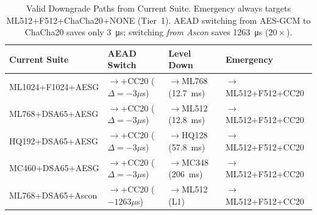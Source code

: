 \begin{table}[!t]
\centering
\caption{Valid Downgrade Paths from Current Suite.
Emergency always targets ML512+F512+ChaCha20+NONE (Tier~1).
AEAD switching from AES-GCM to ChaCha20 saves only \SI{3}{\micro\second};
switching \emph{from Ascon} saves \SI{1263}{\micro\second} ($20{\times}$).}
\label{tab:sched_downgrade}
\footnotesize
\setlength{\tabcolsep}{2.5pt}
\begin{tabular}{@{}l l l l@{}}
\toprule
\textbf{Current Suite} & \textbf{AEAD Switch} & \textbf{Level Down}
& \textbf{Emergency} \\
\midrule
ML1024+F1024+AESG
 & $\to$+CC20 ($\Delta{=}{-}3\mu$s)
 & $\to$ML768 (\SI{12.7}{\ms})
 & $\to$ML512+F512+CC20 \\
ML768+DSA65+AESG
 & $\to$+CC20 ($\Delta{=}{-}3\mu$s)
 & $\to$ML512 (\SI{12.8}{\ms})
 & $\to$ML512+F512+CC20 \\
HQ192+DSA65+AESG
 & $\to$+CC20 ($\Delta{=}{-}3\mu$s)
 & $\to$HQ128 (\SI{57.8}{\ms})
 & $\to$ML512+F512+CC20 \\
MC460+DSA65+AESG
 & $\to$+CC20 ($\Delta{=}{-}3\mu$s)
 & $\to$MC348 (\SI{206}{\ms})
 & $\to$ML512+F512+CC20 \\
ML768+DSA65+Ascon
 & $\to$+CC20 ($-1263\mu$s)
 & $\to$ML512 (L1)
 & $\to$ML512+F512+CC20 \\
\bottomrule
\end{tabular}
\end{table}

